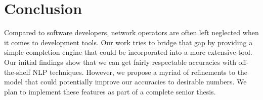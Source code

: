 \section{Conclusion}
Compared to software developers, network operators are often left neglected when it comes to development tools. Our work tries to bridge that gap by providing a simple completion engine that could be incorporated into a more extensive tool. Our initial findings show that we can get fairly respectable accuracies with off-the-shelf NLP techniques. However, we propose a myriad of refinements to the model that could potentially improve our accuracies to desirable numbers. We plan to implement these features as part of a complete senior thesis.